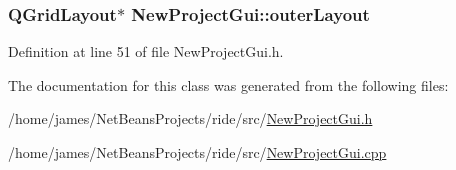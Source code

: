 \hypertarget{class_new_project_gui_ab8c8c2da1803bbbc90d8aa5e90ac9aec}{
\subsubsection[{outer\-Layout}]{\setlength{\rightskip}{0pt plus 5cm}Q\-Grid\-Layout$\ast$ New\-Project\-Gui\-::outer\-Layout\hspace{0.3cm}{\ttfamily [private]}}}\label{class_new_project_gui_ab8c8c2da1803bbbc90d8aa5e90ac9aec}


Definition at line 51 of file New\-Project\-Gui.\-h.



The documentation for this class was generated from the following files\-:\begin{DoxyCompactItemize}
\item 
/home/james/\-Net\-Beans\-Projects/ride/src/\hyperlink{_new_project_gui_8h}{New\-Project\-Gui.\-h}\item 
/home/james/\-Net\-Beans\-Projects/ride/src/\hyperlink{_new_project_gui_8cpp}{New\-Project\-Gui.\-cpp}\end{DoxyCompactItemize}
